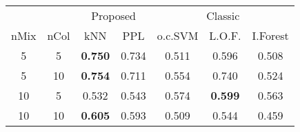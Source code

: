 
\begin{tabular}{ccccccc}
\toprule
\multicolumn{2}{c}{ } & \multicolumn{2}{c}{Proposed} & \multicolumn{3}{c}{Classic} \\
\cmidrule(l{3pt}r{3pt}){3-4} \cmidrule(l{3pt}r{3pt}){5-7}
nMix & nCol & kNN & PPL & o.c.SVM & L.O.F. & I.Forest\\
\midrule
5 & 5 & {\bf 0.750} & 0.734 & 0.511 & 0.596 & 0.508\\
5 & 10 & {\bf 0.754} & 0.711 & 0.554 & 0.740 & 0.524\\
10 & 5 & 0.532 & 0.543 & 0.574 & {\bf 0.599} & 0.563\\
10 & 10 & {\bf 0.605} & 0.593 & 0.509 & 0.544 & 0.459\\
\bottomrule
\end{tabular}
